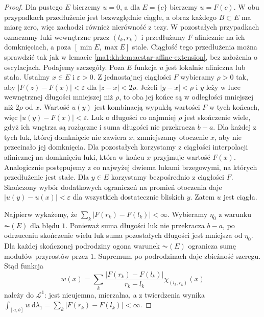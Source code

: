 \begin{proof}
Dla pustego $E$ bierzemy $u=0$, a dla $E=\{c\}$ bierzemy $u=F(c)$. W obu przypadkach przedłużenie jest bezwzględnie ciągłe, a obraz każdego $B\subset E$ ma miarę zero, więc zachodzi również nierówność z tezy. W pozostałych przypadkach oznaczamy luki wewnętrzne przez $(l_k,r_k)$ i przedłużamy $F$ afinicznie na ich domknięciach, a poza $[\min E,\max E]$ stale. Ciągłość tego przedłużenia można sprawdzić tak jak
w lemacie \ref{ma1:kh:lem:acstar-affine-extension}, bez
założenia o oscylacjach. Podajemy szczegóły.
Poza $E$ funkcja $u$ jest lokalnie afiniczna lub stała.
Ustalmy $x\in E$ i $\varepsilon>0$. Z jednostajnej
ciągłości $F$ wybieramy $\rho>0$ tak, aby
$|F(z)-F(x)|<\varepsilon$ dla $|z-x|<2\rho$.
Jeżeli $|y-x|<\rho$ i $y$ leży w luce wewnętrznej
długości mniejszej niż $\rho$, to oba jej końce są
w odległości mniejszej niż $2\rho$ od $x$.
Wartość $u(y)$ jest kombinacją wypukłą wartości $F$
w tych końcach, więc $|u(y)-F(x)|<\varepsilon$.
Luk o długości co najmniej $\rho$ jest skończenie
wiele, gdyż ich wnętrza są rozłączne i suma długości
nie przekracza $b-a$. Dla każdej z tych luk, której
domknięcie nie zawiera $x$, zmniejszamy otoczenie
$x$, aby nie przecinało jej domknięcia. Dla pozostałych
korzystamy z ciągłości interpolacji afinicznej na
domknięciu luki, która w końcu $x$ przyjmuje wartość
$F(x)$. Analogicznie postępujemy z co najwyżej dwiema
lukami brzegowymi, na których przedłużenie jest stałe.
Dla $y\in E$ korzystamy bezpośrednio z ciągłości $F$.
Skończony wybór dodatkowych ograniczeń na promień
otoczenia daje $|u(y)-u(x)|<\varepsilon$ dla wszystkich
dostatecznie bliskich $y$. Zatem $u$ jest ciągła.

Najpierw wykażemy, że $\sum_k|F(r_k)-F(l_k)|<\infty$. Wybieramy $\eta_0$ z warunku $\AC(E)$ dla błędu $1$. Ponieważ suma długości luk nie przekracza $b-a$, po odrzuceniu skończenie wielu luk suma pozostałych długości jest mniejsza od $\eta_0$. Dla każdej skończonej podrodziny ogona warunek $\AC(E)$ ogranicza sumę modułów przyrostów przez $1$. Supremum po podrodzinach daje zbieżność szeregu.
Stąd funkcja
\[
 w(x)=\sum_k\frac{|F(r_k)-F(l_k)|}{r_k-l_k}\chi_{(l_k,r_k)}(x)
\]
należy do $\mathcal L^1$: jest nieujemna, mierzalna, a z twierdzenia  wynika $\int_{[a,b]}w\,\mathrm d\lambda_1=\sum_k|F(r_k)-F(l_k)|<\infty$.


\end{proof}
